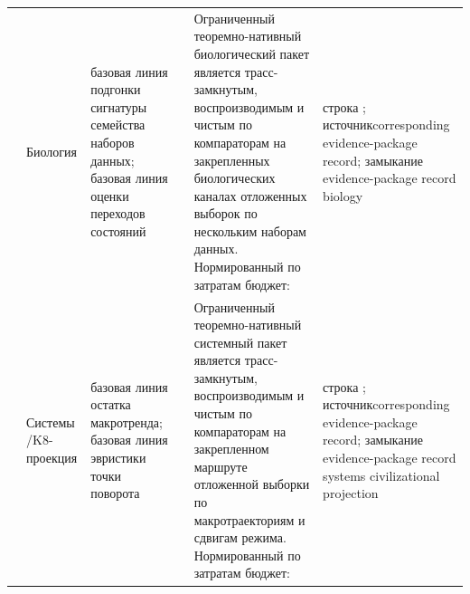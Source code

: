\begin{longtable}{@{}L{0.14\textwidth}L{0.10\textwidth}L{0.17\textwidth}L{0.10\textwidth}L{0.23\textwidth}L{0.18\textwidth}@{}}
 & Биология & базовая линия подгонки сигнатуры семейства наборов данных; базовая линия оценки переходов состояний &  & Ограниченный теоремно-нативный биологический пакет является трасс-замкнутым, воспроизводимым и чистым по компараторам на закрепленных биологических каналах отложенных выборок по нескольким наборам данных. \allowbreak Нормированный по затратам бюджет:  & строка ; \allowbreak источникcorresponding evidence-package record; \allowbreak замыкание evidence-package record biology \\
 & Системы /\allowbreak K8-проекция & базовая линия остатка макротренда; базовая линия эвристики точки поворота &  & Ограниченный теоремно-нативный системный пакет является трасс-замкнутым, воспроизводимым и чистым по компараторам на закрепленном маршруте отложенной выборки по макротраекториям и сдвигам режима. \allowbreak Нормированный по затратам бюджет:  & строка ; \allowbreak источникcorresponding evidence-package record; \allowbreak замыкание evidence-package record systems civilizational projection \\
\bottomrule
\end{longtable}
\endgroup

